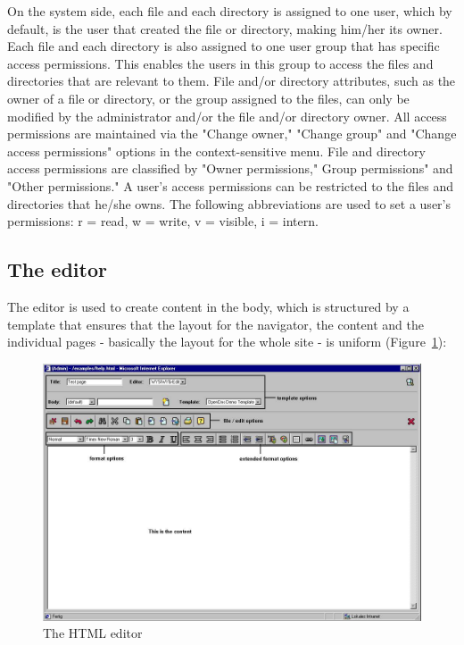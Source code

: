 On the system side, each file and each directory is assigned to
one user, which by default, is the user that created the file or
directory, making him/her its owner. Each file and each directory
is also assigned to one user group that has specific access
permissions. This enables the users in this group to access the
files and directories that are relevant to them. File and/or
directory attributes, such as the owner of a file or directory, or
the group assigned to the files, can only be modified by the
administrator and/or the file and/or directory owner. All access
permissions are maintained via the "Change owner," "Change group"
and "Change access permissions" options in the context-sensitive
menu. File and directory access permissions are classified by
"Owner permissions," Group permissions" and "Other permissions." A
user's access permissions can be restricted to the files and
directories that he/she owns. The following abbreviations are used
to set a user's permissions: r = read, w = write, v = visible, i =
intern.

\subsection{The editor}

The editor is used to create content in the body, which is
structured by a template that ensures that the layout for the
navigator, the content and the individual pages - basically the
layout for the whole site - is uniform
(Figure~\ref{thehtmleditor}):

\begin{figure}[hbt]
\begin{center}
\includegraphics[width=\sgw]
                   {pics/usermanual/theHtmlEditor}
\caption[The HTML editor]
           {The HTML editor}
\label{thehtmleditor}
\end{center}
\end{figure}

